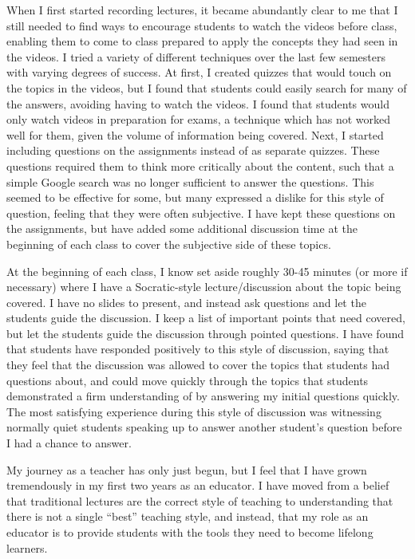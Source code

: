 When I first started recording lectures, it became abundantly clear to me that I still needed to find ways to encourage students to watch the videos before class, enabling them to come to class prepared to apply the concepts they had seen in the videos. I tried a variety of different techniques over the last few semesters with varying degrees of success. At first, I created quizzes that would touch on the topics in the videos, but I found that students could easily search for many of the answers, avoiding having to watch the videos. I found that students would only watch videos in preparation for exams, a technique which has not worked well for them, given the volume of information being covered. Next, I started including questions on the assignments instead of as separate quizzes. These questions required them to think more critically about the content, such that a simple Google search was no longer sufficient to answer the questions. This seemed to be effective for some, but many expressed a dislike for this style of question, feeling that they were often subjective. I have kept these questions on the assignments, but have added some additional discussion time at the beginning of each class to cover the subjective side of these topics.

At the beginning of each class, I know set aside roughly 30-45 minutes (or more if necessary) where I have a Socratic-style lecture/discussion about the topic being covered. I have no slides to present, and instead ask questions and let the students guide the discussion. I keep a list of important points that need covered, but let the students guide the discussion through pointed questions. I have found that students have responded positively to this style of discussion, saying that they feel that the discussion was allowed to cover the topics that students had questions about, and could move quickly through the topics that students demonstrated a firm understanding of by answering my initial questions quickly. The most satisfying experience during this style of discussion was witnessing normally quiet students speaking up to answer another student's question before I had a chance to answer.

My journey as a teacher has only just begun, but I feel that I have grown tremendously in my first two years as an educator. I have moved from a belief that traditional lectures are the correct style of teaching to understanding that there is not a single ``best'' teaching style, and instead, that my role as an educator is to provide students with the tools they need to become lifelong learners.